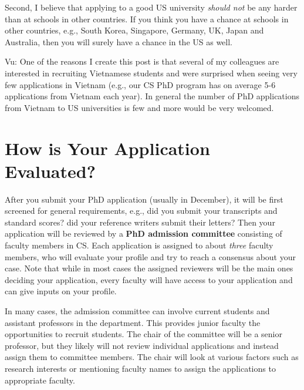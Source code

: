 \documentclass[11pt]{article}
\newenvironment{commentbox}{
 \small
    \begin{cbox}
 }{
   \end{cbox}
}
\begin{document}
Second, I believe that applying to a good US university \emph{should not} be any
harder than at schools in other countries. If you think you have a
chance at schools in other countries, e.g., South Korea, Singapore, Germany, UK, Japan and Australia, then you will surely have a chance in the US as well.

\begin{commentbox}
Vu: One of the reasons I create this post is that several of my colleagues are interested in 
recruiting Vietnamese students and were surprised when seeing very few applications in Vietnam (e.g., our CS PhD program has on average 5-6 applications from Vietnam each year). In general the number of
PhD applications from Vietnam to US universities is few and  more would be very welcomed. 
\end{commentbox}



\section{How is Your Application Evaluated?}

After you submit your PhD application (usually in December), it will be first screened
for general requirements, e.g., did you submit your transcripts and standard scores? did your reference writers submit their letters?
Then your application will be reviewed by a
\textbf{PhD admission committee} consisting of faculty members in CS. Each application is assigned to about \emph{three} faculty members, who will evaluate your profile and try to reach a consensus about your case.  Note that while in most cases the assigned reviewers will be the main ones deciding your application, every faculty will have access to your application and can give inputs on your profile.

In many cases, the admission committee can involve current students and assistant professors in the department. This provides junior faculty the opportunities to recruit students. The chair of the committee will be a senior professor, but they likely will not review individual applications and instead assign them to committee members. The chair will look at various factors such as research interests or mentioning faculty names to assign the applications to appropriate faculty. 
\end{document}
